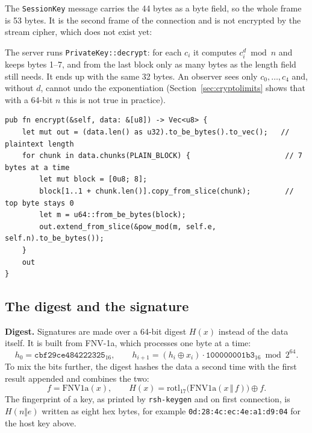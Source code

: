 \begin{table}[H]
\centering
\footnotesize

\caption{The session key under RSA with the host key of Table~\ref{tab:hostkey}.}
\label{tab:rsablocks}
\end{table}

The \texttt{SessionKey} message carries the 44 bytes as a byte field, so the
whole frame is 53 bytes. It is the second frame of the connection and is not
encrypted by the stream cipher, which does not exist yet:



The server runs \texttt{PrivateKey::decrypt}: for each $c_i$ it computes
$c_i^{d} \bmod n$ and keeps bytes 1--7, and from the last block only as many
bytes as the length field still needs. It ends up with the same 32 bytes.
An observer sees only $c_0, \ldots, c_4$ and, without $d$, cannot undo the
exponentiation (Section~\ref{sec:cryptolimits} shows that with a 64-bit $n$ this
is not true in practice).

\begin{lstlisting}[caption={Block encryption (\texttt{rsa.rs}).}]
pub fn encrypt(&self, data: &[u8]) -> Vec<u8> {
    let mut out = (data.len() as u32).to_be_bytes().to_vec();   // plaintext length
    for chunk in data.chunks(PLAIN_BLOCK) {                      // 7 bytes at a time
        let mut block = [0u8; 8];
        block[1..1 + chunk.len()].copy_from_slice(chunk);        // top byte stays 0
        let m = u64::from_be_bytes(block);
        out.extend_from_slice(&pow_mod(m, self.e, self.n).to_be_bytes());
    }
    out
}
\end{lstlisting}

\subsection{The digest and the signature}
\label{sec:signature}

\textbf{Digest.} Signatures are made over a 64-bit digest $H(x)$ instead of
the data itself. It is built from FNV-1a, which processes one byte at a time:
\[
  h_0 = \texttt{cbf29ce484222325}_{16}, \qquad
  h_{i+1} = (h_i \oplus x_i) \cdot \texttt{100000001b3}_{16} \bmod 2^{64}.
\]
To mix the bits further, the digest hashes the data a second time with the
first result appended and combines the two:
\[
  f = \mathrm{FNV1a}(x), \qquad
  H(x) = \mathrm{rotl}_{17}\bigl(\mathrm{FNV1a}(x \,\Vert\, f)\bigr) \oplus f .
\]
The fingerprint of a key, as printed by \texttt{rsh-keygen} and on first
connection, is $H(n \Vert e)$ written as eight hex bytes, for example
\texttt{0d:28:4c:ec:4e:a1:d9:04} for the host key above.

